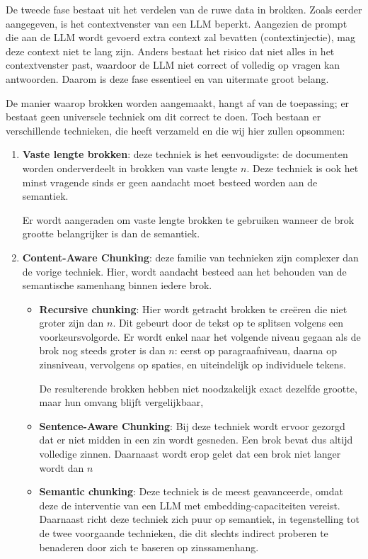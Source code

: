 De tweede fase bestaat uit het verdelen van de ruwe data in brokken. Zoals eerder aangegeven, is het contextvenster van een \acrshort{LLM} beperkt. Aangezien de prompt die aan de \acrshort{LLM} wordt gevoerd extra context zal bevatten (contextinjectie), mag deze context niet te lang zijn. Anders bestaat het risico dat niet alles in het contextvenster past, waardoor de \acrshort{LLM} niet correct of volledig op vragen kan antwoorden. Daarom is deze fase essentieel en van uitermate groot belang.

De manier waarop brokken worden aangemaakt, hangt af van de toepassing; er bestaat geen universele techniek om dit correct te doen. Toch bestaan er verschillende technieken, die \textcite{Kshirsagar2024} heeft verzameld en die wij hier zullen opsommen:

\begin{enumerate} 
    \item \textbf{Vaste lengte brokken}: deze techniek is het eenvoudigste: de documenten worden onderverdeelt in brokken van vaste lengte $n$. Deze techniek is ook het minst vragende sinds er geen aandacht moet besteed worden aan de semantiek. 
    
    Er wordt aangeraden om vaste lengte brokken te gebruiken wanneer de brok grootte belangrijker is dan de semantiek.
    \item \textbf{Content-Aware Chunking}: deze familie van technieken zijn complexer dan de vorige techniek. Hier, wordt aandacht besteed aan het behouden van de semantische samenhang binnen iedere brok.
    
        \begin{itemize}
            \item \textbf{Recursive chunking}: Hier wordt getracht brokken te creëren die niet groter zijn dan $n$. Dit gebeurt door de tekst op te splitsen volgens een voorkeursvolgorde. Er wordt enkel naar het volgende niveau gegaan als de brok nog steeds groter is dan $n$: eerst op paragraafniveau, daarna op zinsniveau, vervolgens op spaties, en uiteindelijk op individuele tekens.
            
            De resulterende brokken hebben niet noodzakelijk exact dezelfde grootte, maar hun omvang blijft vergelijkbaar,
            \item \textbf{Sentence-Aware Chunking}: Bij deze techniek wordt ervoor gezorgd dat er niet midden in een zin wordt gesneden. Een brok bevat dus altijd volledige zinnen. Daarnaast wordt erop gelet dat een brok niet langer wordt dan $n$
            \item \textbf{Semantic chunking}: Deze techniek is de meest geavanceerde, omdat deze de interventie van een LLM met embedding-capaciteiten vereist. Daarnaast richt deze techniek zich puur op semantiek, in tegenstelling tot de twee voorgaande technieken, die dit slechts indirect proberen te benaderen door zich te baseren op zinssamenhang. 
            

\end{itemize}
\end{enumerate}
